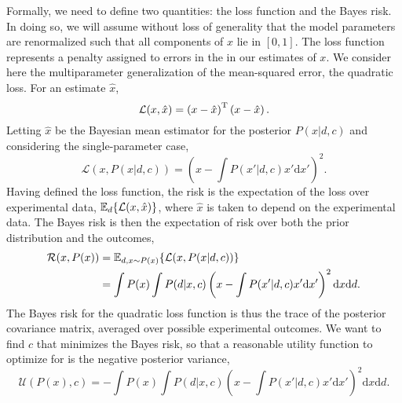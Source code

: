 \documentclass[aps,amsmath,onecolumn,amssymb,notitlepage]{revtex4-1}
\begin{document}

Formally, we need to define two quantities: the loss function and the Bayes
risk. In doing so, we will assume without loss of generality that the model
parameters are renormalized such that all components of $x$ lie in $[0, 1]$.
The loss function represents a penalty assigned to errors in the in our
estimates of $x$. We consider here the multiparameter generalization of the
mean-squared error, the quadratic loss. For an estimate $\hat{x}$,
\begin{equation}
    \mathcal{L}(x, \hat{x}) = \left(x - \hat{x}\right)^\TT \left(x - \hat{x}\right).
\end{equation}
Letting $\hat{x}$ be the Bayesian mean estimator for the posterior $P(x | d, c)$
and considering the single-parameter case,
\begin{equation}
    \mathcal{L}(x, P(x|d,c)) = \left(x-\int P(x'|d,c) x' \mathrm{d}x'\right)^2.
\end{equation}
Having defined the loss function, the risk is the expectation of the loss over
experimental data, $\expect{\mathcal{L}(x, \hat{x})}{d}$, where $\hat{x}$ is
taken to depend on the experimental data. The Bayes risk is then the
expectation of risk over both the prior distribution and the outcomes,
\begin{gather}
    \begin{aligned}
        \mathcal{R}(x, P(x)) & = \expect{\mathcal{L}(x, P(x | d, c))}{d, x \sim P(x)} \\
                             & = \int P(x)\int P(d|x,c) \left(x-\int P(x'|d,c) x' \mathrm{d}x'\right)^2 \mathrm{d}x\mathrm{d}d.
    \end{aligned}
\end{gather}
The Bayes risk for the quadratic loss function is thus the trace of the posterior covariance matrix,
averaged over possible experimental outcomes.
We want to find $c$ that minimizes the Bayes risk, so that a reasonable utility function to optimize for is the negative posterior variance,
\begin{equation}
    \label{eq:utility}
    \mathcal{U}(P(x),c) = -\int P(x)\int P(d|x,c) \left(x-\int P(x'|d,c) x' \mathrm{d}x'\right)^2 \mathrm{d}x\mathrm{d}d.
\end{equation}
\end{document}
